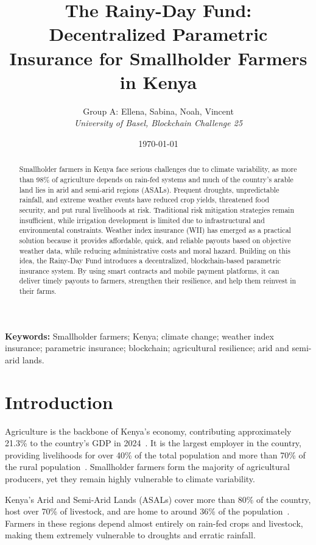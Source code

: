 \documentclass[11pt,a4paper]{article}
\title{\textbf{The Rainy-Day Fund: Decentralized Parametric Insurance for Smallholder Farmers in Kenya}}
\author{
    Group A: Ellena, Sabina, Noah, Vincent\\
    \textit{University of Basel, Blockchain Challenge 25}
}
\date{\today}
\begin{document}
    \maketitle

    \begin{abstract}
        Smallholder farmers in Kenya face serious challenges due to climate variability, as more than 98\% of agriculture depends on rain-fed systems and much of the country’s arable land lies in arid and semi-arid regions (ASALs).
        Frequent droughts, unpredictable rainfall, and extreme weather events have reduced crop yields, threatened food security, and put rural livelihoods at risk.
        Traditional risk mitigation strategies remain insufficient, while irrigation development is limited due to infrastructural and environmental constraints.
        Weather index insurance (WII) has emerged as a practical solution because it provides affordable, quick, and reliable payouts based on objective weather data, while reducing administrative costs and moral hazard.
        Building on this idea, the Rainy-Day Fund introduces a decentralized, blockchain-based parametric insurance system.
        By using smart contracts and mobile payment platforms, it can deliver timely payouts to farmers, strengthen their resilience, and help them reinvest in their farms.
    \end{abstract}

    \textbf{Keywords:} Smallholder farmers; Kenya; climate change; weather index insurance; parametric insurance; blockchain; agricultural resilience; arid and semi-arid lands.

    \section*{Introduction}
    Agriculture is the backbone of Kenya’s economy, contributing approximately 21.3\% to the country’s GDP in 2024~\parencite{WorldBank2024}.
    It is the largest employer in the country, providing livelihoods for over 40\% of the total population and more than 70\% of the rural population~\parencite{FAO2024}.
    Smallholder farmers form the majority of agricultural producers, yet they remain highly vulnerable to climate variability.

    Kenya’s Arid and Semi-Arid Lands (ASALs) cover more than 80\% of the country, host over 70\% of livestock, and are home to around 36\% of the population~\parencite{IUCN2021,NDMA2021,UNEPDHI2021}.
    Farmers in these regions depend almost entirely on rain-fed crops and livestock, making them extremely vulnerable to droughts and erratic rainfall.
\end{document}
